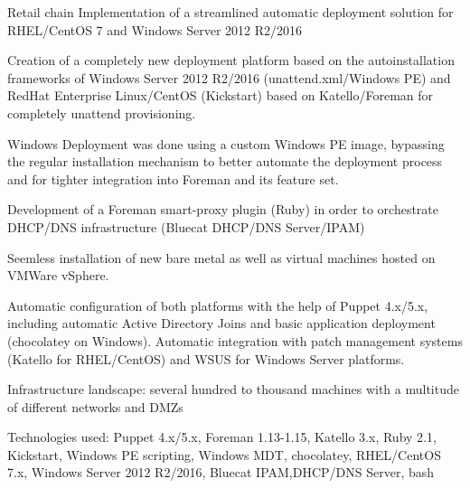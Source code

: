 

\begin{cventries}
  \cventry
    {Retail chain}
    {Implementation of a streamlined automatic deployment solution for RHEL/CentOS 7 and Windows
      Server 2012 R2/2016}
    {}
    {}
    {
      \begin{cvitems}
      \item Creation of a completely new deployment platform based on the autoinstallation
        frameworks of Windows Server 2012 R2/2016 (unattend.xml/Windows PE) and RedHat Enterprise
        Linux/CentOS (Kickstart) based on Katello/Foreman for completely unattend provisioning.
      \item Windows Deployment was done using a custom Windows PE image, bypassing the regular
        installation mechanism to better automate the deployment process and for tighter integration
        into Foreman and its feature set.
      \item Development of a Foreman smart-proxy plugin (Ruby) in order to orchestrate DHCP/DNS infrastructure (Bluecat DHCP/DNS Server/IPAM)
      \item Seemless installation of new bare metal as well as virtual machines hosted on VMWare vSphere.
      \item Automatic configuration of both
        platforms with the help of Puppet 4.x/5.x, including automatic Active Directory Joins and
        basic application deployment (chocolatey on Windows). Automatic integration with patch management
        systems (Katello for RHEL/CentOS) and WSUS for Windows Server platforms.
      \item Infrastructure landscape: several hundred to thousand machines with a multitude of
        different networks and DMZs
      \item Technologies used: Puppet 4.x/5.x, Foreman 1.13-1.15, Katello 3.x, Ruby 2.1, Kickstart, Windows PE scripting, Windows
        MDT, chocolatey, RHEL/CentOS 7.x, Windows Server 2012 R2/2016, Bluecat IPAM,DHCP/DNS Server,
        bash
      \end{cvitems}
    }


\end{cventries}
